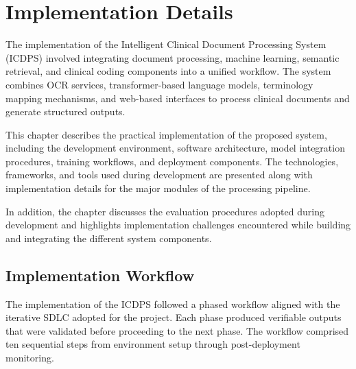 \chapter{Implementation Details}

The implementation of the Intelligent Clinical Document Processing System (ICDPS) involved integrating document processing, machine learning, semantic retrieval, and clinical coding components into a unified workflow. The system combines OCR services, transformer-based language models, terminology mapping mechanisms, and web-based interfaces to process clinical documents and generate structured outputs.

This chapter describes the practical implementation of the proposed system, including the development environment, software architecture, model integration procedures, training workflows, and deployment components. The technologies, frameworks, and tools used during development are presented along with implementation details for the major modules of the processing pipeline.

In addition, the chapter discusses the evaluation procedures adopted during development and highlights implementation challenges encountered while building and integrating the different system components.

\section{Implementation Workflow}

The implementation of the ICDPS followed a phased workflow aligned with the iterative SDLC adopted for the project. Each phase produced verifiable outputs that were validated before proceeding to the next phase. The workflow comprised ten sequential steps from environment setup through post-deployment monitoring.

